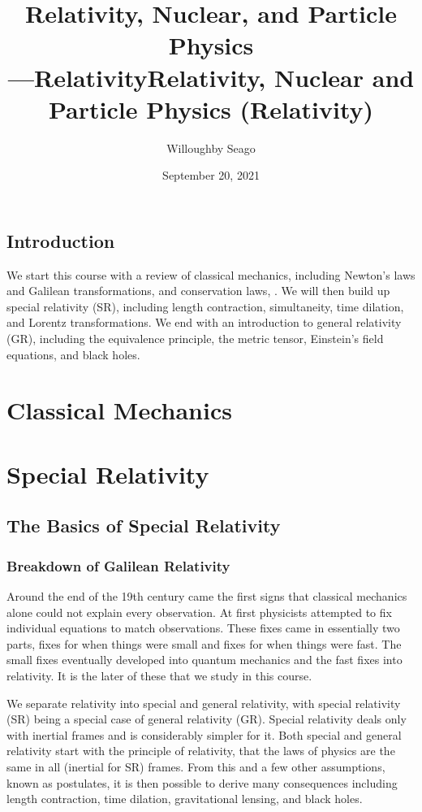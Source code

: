 \documentclass[fleqn]{NotesClass}
\title{Relativity, Nuclear, and Particle Physics\\{\Huge---Relativity}}
\author{Willoughby Seago}
\date{September 20, 2021}
\begin{document}
    \frontmatter
    \titlepage
    \title{Relativity, Nuclear and Particle Physics (Relativity)}
    \tableofcontents
    \mainmatter
    
    \chapter{Introduction}
    We start this course with a review of classical mechanics, including Newton's laws and Galilean transformations, and conservation laws, .
    We will then build up special relativity (SR), including length contraction, simultaneity, time dilation, and Lorentz transformations.
    We end with an introduction to general relativity (GR), including the equivalence principle, the metric tensor, Einstein's field equations, and black holes.
    
    \part{Classical Mechanics}
    
    
    \part{Special Relativity}
    \chapter{The Basics of Special Relativity}
    \section{Breakdown of Galilean Relativity}
    Around the end of the 19th century came the first signs that classical mechanics alone could not explain every observation.
    At first physicists attempted to fix individual equations to match observations.
    These fixes came in essentially two parts, fixes for when things were small and fixes for when things were fast.
    The small fixes eventually developed into quantum mechanics and the fast fixes into relativity.
    It is the later of these that we study in this course.
    
    We separate relativity into special and general relativity, with special relativity (SR) being a special case of general relativity (GR).
    Special relativity deals only with inertial frames and is considerably simpler for it.
    Both special and general relativity start with the principle of relativity, that the laws of physics are the same in all (inertial for SR) frames.
    From this and a few other assumptions, known as postulates, it is then possible to derive many consequences including length contraction, time dilation, gravitational lensing, and black holes.
    
\end{document}
